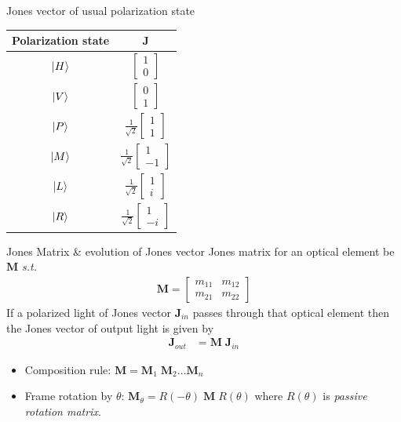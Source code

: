 \documentclass[12pt, dvipsnames]{beamer}
\numberwithin{equation}{section}
\begin{document}
\begin{frame}{Jones vector of usual polarization state}
	\begin{table}[H]
		\centering
		\begin{tabular}{ c c } 
			Polarization state & $\boldsymbol{J}$\\
			\hline
			$\ket{H}$ & $\begin{bmatrix}1\\0\end{bmatrix}$ \\ \hline
			$\ket{V}$ & $\begin{bmatrix}0\\1\end{bmatrix}$ \\ \hline
			$\ket{P}$ & $\frac{1}{\sqrt{2}}\begin{bmatrix}1\\1\end{bmatrix}$ \\ \hline
			$\ket{M}$ & $\frac{1}{\sqrt{2}}\begin{bmatrix}1\\-1\end{bmatrix}$ \\ \hline
			$\ket{L}$ & $\frac{1}{\sqrt{2}}\begin{bmatrix}1\\i\end{bmatrix}$ \\ \hline
			$\ket{R}$ & $\frac{1}{\sqrt{2}}\begin{bmatrix}1\\-i\end{bmatrix}$ \\ 
			\hline
		\end{tabular}
		\label{table:1}
	\end{table}
\end{frame}

\begin{frame}{Jones Matrix \& evolution of Jones vector}
	Jones matrix for an optical element be $\boldsymbol{M}$ \textit{s.t.} 
	\begin{align*}\boldsymbol{M}=
		\begin{bmatrix}
			m_{11} & m_{12}\\
			m_{21} & m_{22}
		\end{bmatrix}
	\end{align*}\pause
	If a polarized light of Jones vector $\boldsymbol{J}_{in}$ passes through that optical element then the Jones vector of output light is given by 
	\begin{align*}
		\boldsymbol{J}_{out}&=\boldsymbol{M}\;\boldsymbol{J}_{in}
	\end{align*}\pause
	\begin{itemize}
		\item Composition rule: 
		$\boldsymbol{M}=\boldsymbol{M}_1\;\boldsymbol{M}_2\dots\boldsymbol{M}_n$
		
		\item Frame rotation by $\theta$: 
		$\boldsymbol{M}_\theta = R(-\theta)\;\boldsymbol{M}\;R(\theta)$
		where $R(\theta)$ is \textit{passive rotation matrix}.
	\end{itemize}
\end{frame}
\end{document}
